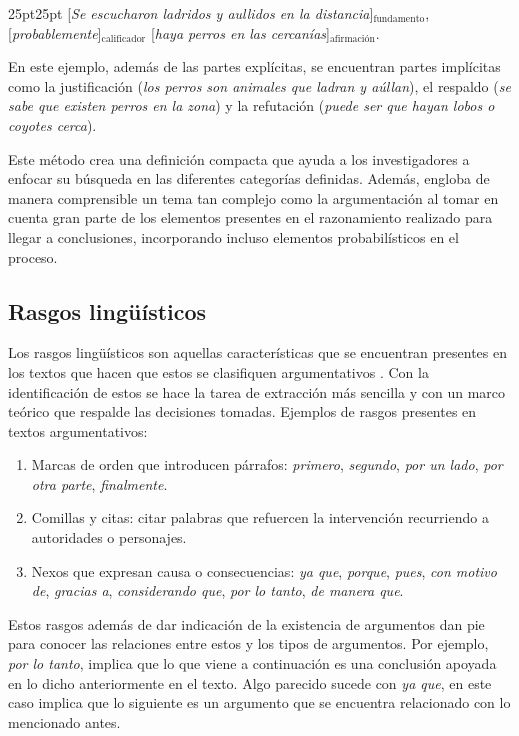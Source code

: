 \documentclass[a4paper,11pt,twocolumn,twoside]{article}
\begin{document}
\begin{adjustwidth}{25pt}{25pt}
	[\textit{Se escucharon ladridos y aullidos en la distancia}]$_{\mathrm{fundamento}}$, 
	[\textit{probablemente}]$_{\mathrm{calificador}}$
	[\textit{haya perros en las cercanías}]$_{\mathrm{\text{afirmación}}}$.
\end{adjustwidth}

En este ejemplo, además de las partes explícitas, se encuentran partes implícitas como la justificación 
(\textit{los perros son animales que ladran y aúllan}), el respaldo (\textit{se sabe que existen perros en la zona}) y 
la refutación (\textit{puede ser que hayan lobos o coyotes cerca}).

Este método crea una definición compacta que ayuda a los investigadores a enfocar su búsqueda 
en las diferentes categorías definidas. Además, engloba de manera comprensible un tema tan complejo 
como la argumentación al tomar en cuenta gran parte de los elementos presentes en el razonamiento
realizado para llegar a conclusiones, incorporando incluso elementos probabilísticos en el proceso. 

\subsection{Rasgos lingüísticos}

Los rasgos lingüísticos son aquellas características que se encuentran presentes en los textos 
que hacen que estos se clasifiquen argumentativos \cite{venegas2005hacia}. Con 
la identificación de estos se hace la tarea de extracción más sencilla y con un marco teórico 
que respalde las decisiones tomadas. Ejemplos de rasgos presentes en textos argumentativos:

\begin{enumerate}
	\item Marcas de orden que introducen párrafos: \textit{primero}, \textit{segundo}, \textit{por un lado},
	      \textit{por otra parte}, \textit{finalmente}.
	\item Comillas y citas: citar palabras que refuercen la intervención recurriendo a autoridades
	      o personajes.
	\item Nexos que expresan causa o consecuencias: \textit{ya que}, \textit{porque}, \textit{pues},
	      \textit{con motivo de}, \textit{gracias a}, \textit{considerando que}, \textit{por lo tanto}, \textit{de manera que}.
\end{enumerate}

Estos rasgos además de dar indicación de la existencia de argumentos dan pie para conocer las relaciones
entre estos y los tipos de argumentos. Por ejemplo, \textit{por lo tanto}, implica que lo que viene 
a continuación es una conclusión apoyada en lo dicho anteriormente en el texto. Algo parecido
sucede con \textit{ya que}, en este caso implica que lo siguiente es un argumento que se encuentra 
relacionado con lo mencionado antes.
\end{document}
